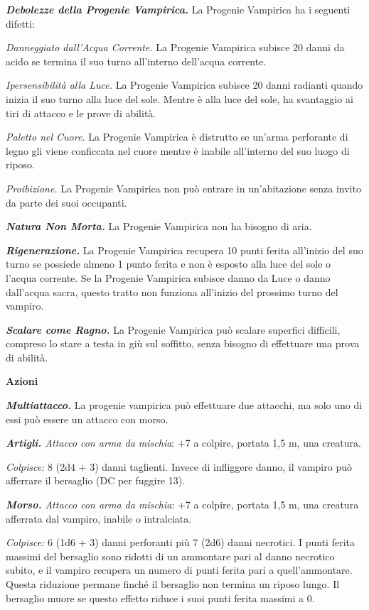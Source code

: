 \begin{multicols}{2}
\emph{\textbf{Debolezze della Progenie Vampirica.}} La Progenie
Vampirica ha i seguenti difetti:

\emph{Danneggiato dall'Acqua Corrente.} La Progenie Vampirica subisce 20
danni da acido se termina il suo turno all'interno dell'acqua corrente.

\emph{Ipersensibilità alla Luce.} La Progenie Vampirica subisce 20 danni
radianti quando inizia il suo turno alla luce del sole. Mentre è alla
luce del sole, ha svantaggio ai tiri di attacco e le prove di abilità.

\emph{Paletto nel Cuore.} La Progenie Vampirica è distrutto se un'arma
perforante di legno gli viene conficcata nel cuore mentre è inabile
all'interno del suo luogo di riposo.

\emph{Proibizione.} La Progenie Vampirica non può entrare in
un'abitazione senza invito da parte dei suoi occupanti.

\emph{\textbf{Natura Non Morta.}} La Progenie Vampirica non ha bisogno
di aria.

\emph{\textbf{Rigenerazione.}} La Progenie Vampirica recupera 10 punti
ferita all'inizio del suo turno se possiede almeno 1 punto ferita e non
è esposto alla luce del sole o l'acqua corrente. Se la Progenie
Vampirica subisce danno da Luce o danno dall'acqua sacra, questo tratto
non funziona all'inizio del prossimo turno del vampiro.

\emph{\textbf{Scalare come Ragno.}} La Progenie Vampirica può scalare
superfici difficili, compreso lo stare a testa in giù sul soffitto,
senza bisogno di effettuare una prova di abilità.

\textbf{Azioni}

\emph{\textbf{Multiattacco.}} La progenie vampirica può effettuare due
attacchi, ma solo uno di essi può essere un attacco con morso.

\emph{\textbf{Artigli.} Attacco con arma da mischia}: +7 a colpire,
portata 1,5 m, una creatura.

\emph{Colpisce:} 8 (2d4 + 3) danni taglienti. Invece di infliggere
danno, il vampiro può afferrare il bersaglio (DC per fuggire 13).

\emph{\textbf{Morso.} Attacco con arma da mischia}: +7 a colpire,
portata 1,5 m, una creatura afferrata dal vampiro, inabile o
intralciata.

\emph{Colpisce:} 6 (1d6 + 3) danni perforanti più 7 (2d6) danni
necrotici. I punti ferita massimi del bersaglio sono ridotti di un
ammontare pari al danno necrotico subito, e il vampiro recupera un
numero di punti ferita pari a quell'ammontare. Questa riduzione permane
finché il bersaglio non termina un riposo lungo. Il bersaglio muore se
questo effetto riduce i suoi punti ferita massimi a 0.


\end{multicols}
